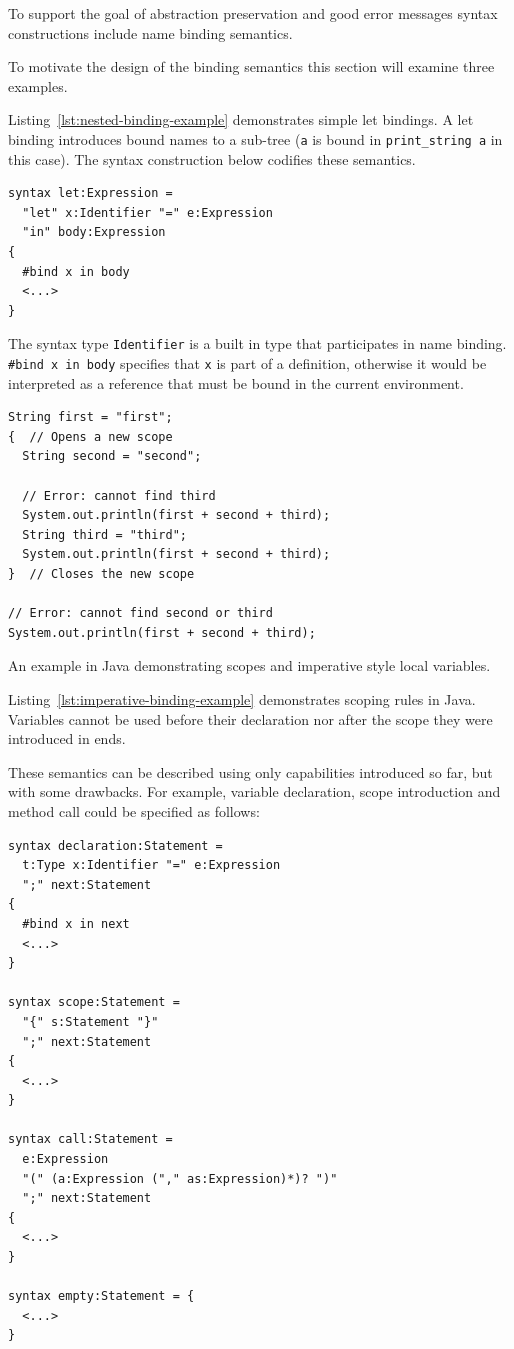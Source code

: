 \documentclass{kththesis}
\begin{document}
To support the goal of abstraction preservation and good error messages syntax constructions include name binding semantics.

To motivate the design of the binding semantics this section will examine three examples.

Listing~\ref{lst:nested-binding-example} demonstrates simple let bindings. A let binding introduces bound names to a sub-tree (\texttt{a} is bound in \texttt{print_string a} in this case). The syntax construction below codifies these semantics.

\begin{verbatim}
syntax let:Expression =
  "let" x:Identifier "=" e:Expression
  "in" body:Expression
{
  #bind x in body
  <...>
}
\end{verbatim}

The syntax type \texttt{Identifier} is a built in type that participates in name binding. \texttt{#bind x in body} specifies that \texttt{x} is part of a definition, otherwise it would be interpreted as a reference that must be bound in the current environment.

\begin{listing}[t]
\begin{verbatim}
String first = "first";
{  // Opens a new scope
  String second = "second";

  // Error: cannot find third
  System.out.println(first + second + third);
  String third = "third";
  System.out.println(first + second + third);
}  // Closes the new scope

// Error: cannot find second or third
System.out.println(first + second + third);
\end{verbatim}
\caption{An example in Java demonstrating scopes and imperative style local variables.}
\label{lst:imperative-binding-example}
\end{listing}

Listing~\ref{lst:imperative-binding-example} demonstrates scoping rules in Java. Variables cannot be used before their declaration nor after the scope they were introduced in ends.

These semantics can be described using only capabilities introduced so far, but with some drawbacks. For example, variable declaration, scope introduction and method call could be specified as follows:

\begin{verbatim}
syntax declaration:Statement =
  t:Type x:Identifier "=" e:Expression
  ";" next:Statement
{
  #bind x in next
  <...>
}

syntax scope:Statement =
  "{" s:Statement "}"
  ";" next:Statement
{
  <...>
}

syntax call:Statement =
  e:Expression
  "(" (a:Expression ("," as:Expression)*)? ")"
  ";" next:Statement
{
  <...>
}

syntax empty:Statement = {
  <...>
}
\end{verbatim}
\end{document}
